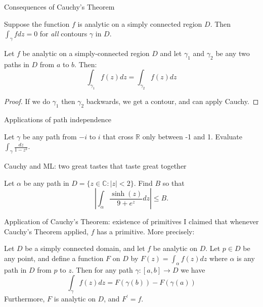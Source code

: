 \documentclass{beamer}
\newcommand{\C}{\mathbb{C}}
\newcommand{\R}{\mathbb{R}}
\begin{document}
\begin{frame}{Consequences of Cauchy's Theorem}
    
\begin{theorem} Suppose the function $f$ is analytic on a \alert{simply connected} region $D$.  Then $\int_\gamma fdz=0$ for \emph{all} contours $\gamma$ in $D$.
\end{theorem}

\begin{corollary}
Let $f$ be analytic on a simply-connected region $D$ and let $\gamma_1$ and $\gamma_2$ be any two paths in $D$ from $a$ to $b$. Then:
 $$\int_{\gamma_1}f(z)dz=\int_{\gamma_2}f(z)dz$$
\end{corollary}
\begin{proof} If we do $\gamma_1$ then $\gamma_2$ backwards, we get a contour, and can apply Cauchy.
\end{proof}
\end{frame}
\begin{frame}{Applications of path independence}
\begin{example}[8.4]Let $\gamma$ be any path from $-i$ to $i$ that cross $\R$ only between -1 and 1.  Evaluate $\int_\gamma\frac{dz}{1-z^2}$.
\end{example}
\begin{block}{Cauchy and ML: two great tastes that taste great together}
\begin{example}[8.5]
Let $\alpha$ be any path in $D=\{z\in\C : |z|<2\}$.  Find $B$ so that
$$\left|\int_\alpha \frac{\sinh(z)}{9+e^z}dz\right|\leq B.$$
\end{example}

\end{block}

\end{frame}

\begin{frame}{Application of Cauchy's Theorem: existence of primitives}
I claimed that whenever Cauchy's Theorem applied, $f$ has a primitive.  More precisely:
\begin{lemma}
Let $D$ be a simply connected domain, and let $f$ be analytic on $D$.  Let $p\in D$ be any point, and define a function $F$ on $D$ by $F(z)=\int_\alpha f(z)dz$ where $\alpha$ is any path in $D$ from $p$ to $z$.  Then for any path $\gamma:[a,b]\to D$ we have
$$\int_\gamma f(z)dz = F(\gamma(b))-F(\gamma(a))$$
Furthermore, $F$ is analytic on $D$, and $F^\prime=f.$
\end{lemma}



\end{frame}
\end{document}
